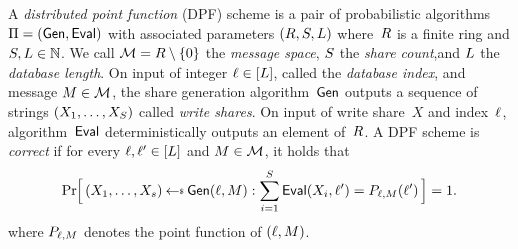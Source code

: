 %
\label{sec-syntax}

A \emph{distributed point function} (DPF) scheme is a pair of probabilistic
algorithms $\mathrm{\Pi} = (\mathsf{Gen}, \mathsf{Eval})$ with associated parameters $(R, S,
L)$ where~$R$ is a finite ring and $S, L \in \mathbb{N}$.
%
We call $\mathcal{M} = R \setminus \{0\}$ the \emph{message space},
$S$ the \emph{share count},and $L$ the \emph{database length}.
%
On input of integer $\ell \in [L]$, called the \emph{database index}, and
message $M \in \mathcal{M}$, the share generation algorithm~$\mathsf{Gen}$ outputs a
sequence of strings $(X_1, \ldots, X_S)$ called \emph{write shares}.
%
On input of
write share~$X$ and index~$\ell$, algorithm~$\mathsf{Eval}$ deterministically
outputs an element of~$R$.
%
A DPF scheme is \emph{correct} if for every $\ell, \ell^\prime \in [L]$ and
$M \in \mathcal{M}$, it holds that
\[
  \Prob{ (X_1, \ldots, X_s) \getsr \gen(\idx,\msg):
       \sum_{i=1}^S \eval(X_i, \idx^\prime) = P_{\idx,\msg}(\idx^\prime)} = 1.
\]
where $P_{\ell,M}$ denotes the point function of $(\ell, M)$.

